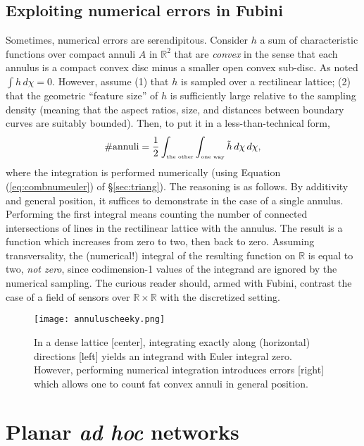 \documentclass{psapm-l}
\theoremstyle{definition}
\theoremstyle{remark}
\numberwithin{equation}{section}
\begin{document}
\subsection{Exploiting numerical errors in Fubini}
\label{sec:errors}
Sometimes, numerical errors are serendipitous. Consider $h$ a sum of characteristic functions over compact annuli $A$ in ${{\mathbb R}}^2$ that are {\em convex} in the sense that each annulus is a compact convex disc minus a smaller open convex sub-disc. As noted $\int h\,d\chi=0$. However, assume (1) that $h$ is sampled over a rectilinear lattice; (2) that the geometric ``feature size'' of $h$ is sufficiently large relative to the sampling density (meaning that the aspect ratios, size, and distances between boundary curves are suitably bounded). Then, to put it in a less-than-technical form,
\begin{equation}
    \#{\mbox{annuli}} = \frac{1}{2}\int_{\tiny{\mbox{the other}}}\int_{\tiny{\mbox{one way}}} \tilde{h}\,d\chi\,d\chi ,
\end{equation}
where the integration is performed numerically (using Equation (\ref{eq:combnumeuler}) of \S\ref{sec:triang}). The reasoning is as follows. By additivity and general position, it suffices to demonstrate in the case of a single annulus. Performing the first integral means counting the number of connected intersections of lines in the rectilinear lattice with the annulus. The result is a function which increases from zero to two, then back to zero. Assuming transversality, the (numerical!) integral of the resulting function on ${{\mathbb R}}$ is equal to two, {\em not zero}, since codimension-1 values of the integrand are ignored by the numerical sampling. The curious reader should, armed with Fubini, contrast the case of a field of sensors over ${{\mathbb R}}\times{{\mathbb R}}$ with the discretized setting.

\begin{figure}[hbt]
\begin{center}
\texttt{[image: annuluscheeky.png]}
\caption{In a dense lattice [center], integrating exactly along (horizontal) directions [left] yields an integrand with Euler integral zero. However, performing numerical integration introduces errors [right] which allows one to count fat convex annuli in general position.}
\label{fig:annuluscheeky}
\end{center}
\end{figure}

\section{Planar {\em ad hoc} networks}
\label{sec:adhoc}
\end{document}
